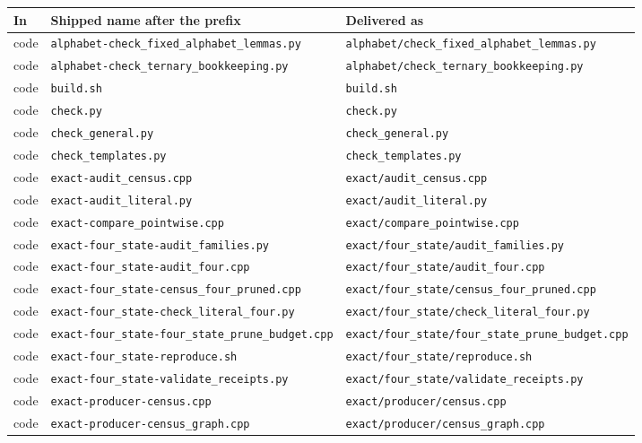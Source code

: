\documentclass[11pt,letterpaper]{article}
\theoremstyle{definition}
\theoremstyle{remark}
\begin{document}
{\footnotesize
\begin{longtable}{@{}P{.06\textwidth}P{.46\textwidth}P{.42\textwidth}@{}}
\toprule
\textbf{In} & \textbf{Shipped name after the prefix} & \textbf{Delivered as}\\
\midrule
\endhead
code & \nolinkurl{alphabet-check_fixed_alphabet_lemmas.py} & \nolinkurl{alphabet/check_fixed_alphabet_lemmas.py}\\
code & \nolinkurl{alphabet-check_ternary_bookkeeping.py} & \nolinkurl{alphabet/check_ternary_bookkeeping.py}\\
code & \nolinkurl{build.sh} & \nolinkurl{build.sh}\\
code & \nolinkurl{check.py} & \nolinkurl{check.py}\\
code & \nolinkurl{check_general.py} & \nolinkurl{check_general.py}\\
code & \nolinkurl{check_templates.py} & \nolinkurl{check_templates.py}\\
code & \nolinkurl{exact-audit_census.cpp} & \nolinkurl{exact/audit_census.cpp}\\
code & \nolinkurl{exact-audit_literal.py} & \nolinkurl{exact/audit_literal.py}\\
code & \nolinkurl{exact-compare_pointwise.cpp} & \nolinkurl{exact/compare_pointwise.cpp}\\
code & \nolinkurl{exact-four_state-audit_families.py} & \nolinkurl{exact/four_state/audit_families.py}\\
code & \nolinkurl{exact-four_state-audit_four.cpp} & \nolinkurl{exact/four_state/audit_four.cpp}\\
code & \nolinkurl{exact-four_state-census_four_pruned.cpp} & \nolinkurl{exact/four_state/census_four_pruned.cpp}\\
code & \nolinkurl{exact-four_state-check_literal_four.py} & \nolinkurl{exact/four_state/check_literal_four.py}\\
code & \nolinkurl{exact-four_state-four_state_prune_budget.cpp} & \nolinkurl{exact/four_state/four_state_prune_budget.cpp}\\
code & \nolinkurl{exact-four_state-reproduce.sh} & \nolinkurl{exact/four_state/reproduce.sh}\\
code & \nolinkurl{exact-four_state-validate_receipts.py} & \nolinkurl{exact/four_state/validate_receipts.py}\\
code & \nolinkurl{exact-producer-census.cpp} & \nolinkurl{exact/producer/census.cpp}\\
code & \nolinkurl{exact-producer-census_graph.cpp} & \nolinkurl{exact/producer/census_graph.cpp}\\

\end{longtable}}
\end{document}
